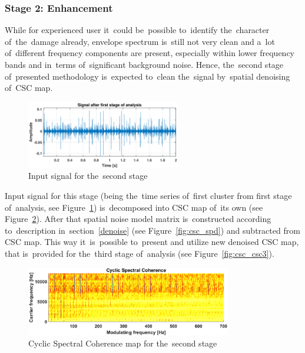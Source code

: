 \subsubsection{Stage 2: Enhancement}

While for experienced user it~could be~possible to~identify the~character of~the~damage already, envelope spectrum is~still not very clean and a~lot of~different frequency components are present, especially within lower frequency bands and in~terms of~significant background noise. Hence, the~second stage of~presented methodology is~expected to~clean the~signal by~spatial denoising of~CSC map.

\begin{figure}[ht!]
\centering
\includegraphics[width=0.6\textwidth]{wykresy/csc_raw2}
\caption{Input signal for the~second stage}
\label{fig:csc_raw2}
\end{figure}

Input signal for this stage (being the~time series of~first cluster from first stage of~analysis, see Figure~\ref{fig:csc_raw2}) is~decomposed into CSC map of~its own (see Figure~\ref{fig:csc_csc2}). After that spatial noise model matrix is~constructed according to~description in~section~\ref{denoise} (see Figure~\ref{fig:csc_spd}) and subtracted from CSC map. This way it~is~possible to~present and utilize new denoised CSC map, that is~provided for the~third stage of~analysis (see Figure~\ref{fig:csc_csc3}).

\begin{figure}[ht!]
\centering
\includegraphics[width=0.8\textwidth]{wykresy/csc_csc2}
\caption{Cyclic Spectral Coherence map for the~second stage}
\label{fig:csc_csc2}
\end{figure}


